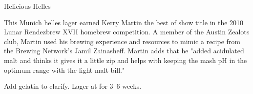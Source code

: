 \begin{recipie}{Helicious Helles}

\begin{aboutblock}
This Munich helles lager earned Kerry Martin the best of show title in the 2010
Lunar Rendezbrew XVII homebrew competition. A member of the Austin Zealots club,
Martin used his brewing experience and resources to mimic a recipe from the
Brewing Network's Jamil Zainasheff. Martin adds that he "added acidulated
malt and thinks it gives it a little zip and helps with keeping the mash pH in
the optimum range with the light malt bill." \sourceaha
\end{aboutblock}


\begin{methodandtiming}
 
\begin{mashsteps}
\end{mashsteps}

\begin{fermentationsteps}
\end{fermentationsteps}

\begin{directions}
Add gelatin to clarify. Lager at  for 3--6 weeks.
\end{directions}

\end{methodandtiming}

\pagebreak

\begin{ingredientsblock}

\begin{malts}
\end{malts}

\begin{hops}
\end{hops}


\end{ingredientsblock}

\end{recipie}

